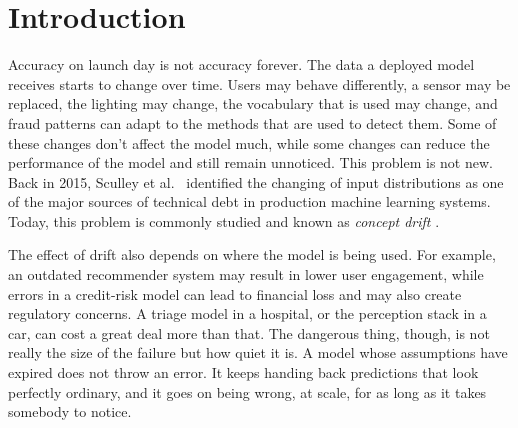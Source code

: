 \documentclass[graybox]{SNmult}
\begin{document}

\section{Introduction}
\label{sec:intro}

Accuracy on launch day is not accuracy forever.
The data a deployed model receives starts to change over time. Users may behave differently, a sensor may be replaced, the lighting may change, the vocabulary that is used may change, and fraud patterns can adapt to the methods that are used to detect them. Some of these changes don't affect the model much, while some changes can reduce the performance of the model and still remain unnoticed. This problem is not new. Back in 2015, Sculley et al.\ \cite{sculley2015debt}
identified the changing of input distributions as one of the major sources of technical debt in production machine learning systems. Today, this problem is commonly studied and known as
\emph{concept drift} \cite{gama2014survey, lu2018learning}. 


 The effect of drift also depends on where the model is being used. For example, an outdated recommender system may result in lower user engagement, while errors in a credit-risk model can lead to financial loss and may also create regulatory concerns.  A triage model in a hospital,
or the perception stack in a car, can cost a great deal more than that.
The dangerous thing, though, is not really the size of the failure but
how quiet it is. A model whose assumptions have expired does not throw
an error. It keeps handing back predictions that look perfectly
ordinary, and it goes on being wrong, at scale, for as long as it takes
somebody to notice.
\end{document}
